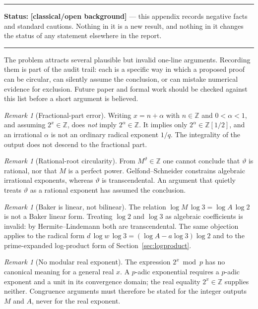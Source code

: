 \documentclass[11pt,oneside]{article}
\theoremstyle{definition}
\theoremstyle{remark}
\newtheorem{remark}[theorem]{Remark}
\newcommand{\Z}{\mathbb Z}
\newcommand{\thetaq}{\vartheta}
\newcommand{\Ztwo}{\Z[1/2]}
\newcommand{\statusknown}{\textcolor{classicalgray}{\textbf{[classical/\allowbreak open background]}}}
\newenvironment{statusbox}[1]
{\begin{center}\begin{minipage}{0.94\textwidth}\raggedright\hbadness=10000\hrule
\vspace{0.45em}\textbf{Status:} #1\par\vspace{0.35em}}
{\vspace{0.35em}\hrule\end{minipage}\end{center}}
\begin{document}
\begin{statusbox}{\statusknown{} --- this appendix records negative facts and standard
cautions.  Nothing in it is a new result, and nothing in it changes the status of any
statement elsewhere in the report.}
\end{statusbox}

The problem attracts several plausible but invalid one-line arguments.  Recording them is
part of the audit trail: each is a specific way in which a proposed proof can be circular,
can silently assume the conclusion, or can mistake numerical evidence for exclusion.  Future
paper and formal work should be checked against this list before a short argument is
believed.

\begin{remark}[Fractional-part error]
\label{a4:warn-fract}
Writing $x=n+\alpha$ with $n\in\Z$ and $0<\alpha<1$, and assuming $2^{x}\in\Z$, does
\emph{not} imply $2^{\alpha}\in\Z$.  It implies only $2^{\alpha}\in\Ztwo$, and an irrational
$\alpha$ is not an ordinary radical exponent $1/q$.  The integrality of the output does not
descend to the fractional part.
\end{remark}

\begin{remark}[Rational-root circularity]
\label{a4:warn-circular}
From $M^{\thetaq}\in\Z$ one cannot conclude that $\thetaq$ is rational, nor that $M$ is a
perfect power.  Gelfond--Schneider constrains algebraic irrational exponents, whereas
$\thetaq$ is transcendental.  An argument that quietly treats $\thetaq$ as a rational
exponent has assumed the conclusion.
\end{remark}

\begin{remark}[Baker is linear, not bilinear]
\label{a4:warn-bilinear}
The relation $\log M\,\log3=\log A\,\log2$ is not a Baker linear form.  Treating $\log2$ and
$\log3$ as algebraic coefficients is invalid: by Hermite--Lindemann both are transcendental.
The same objection applies to the radical form $d\,\log w\,\log3=(\log A-a\log3)\log2$ and to
the prime-expanded log-product form of Section~\ref{sec:logproduct}.
\end{remark}

\begin{remark}[No modular real exponent]
\label{a4:warn-modular}
The expression $2^{x}\bmod p$ has no canonical meaning for a general real $x$.  A $p$-adic
exponential requires a $p$-adic exponent and a unit in its convergence domain; the real
equality $2^{x}\in\Z$ supplies neither.  Congruence arguments must therefore be stated for
the integer outputs $M$ and $A$, never for the real exponent.
\end{remark}
\end{document}
